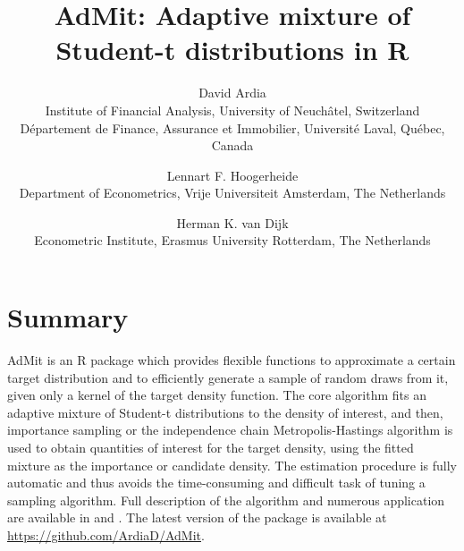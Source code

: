 \documentclass[11pt]{article}
\begin{document}
\title{AdMit: Adaptive mixture of Student-t distributions in R}
\author{David Ardia\\
Institute of Financial Analysis, University of Neuch\^atel, Switzerland\\
D\'epartement de Finance, Assurance et Immobilier, Universit\'e Laval, Qu\'ebec, Canada\and
Lennart F. Hoogerheide\\
Department of Econometrics, Vrije Universiteit Amsterdam, The Netherlands\and
Herman K. van Dijk\\
Econometric Institute, Erasmus University Rotterdam, The Netherlands}
	
\maketitle

\section*{Summary}

AdMit is an R package \citep{R} which provides flexible functions to approximate
a certain target distribution and to efficiently generate a sample of random draws from it, 
given only a kernel of the target density function. 
The core algorithm fits an adaptive mixture
of Student-t distributions to the density of interest, and then, importance sampling
or the independence chain Metropolis-Hastings algorithm is used to obtain quantities of interest for
the target density, using the fitted mixture as the importance or candidate density. 
The estimation procedure is fully automatic and thus avoids the time-consuming and
difficult task of tuning a sampling algorithm. Full description of the algorithm
and numerous application are available in \citet{ArdiaEtAl2009a} and \citet{ArdiaEtAl2009b}.
The latest version of the package is available at \url{https://github.com/ArdiaD/AdMit}.



	
\end{document}
